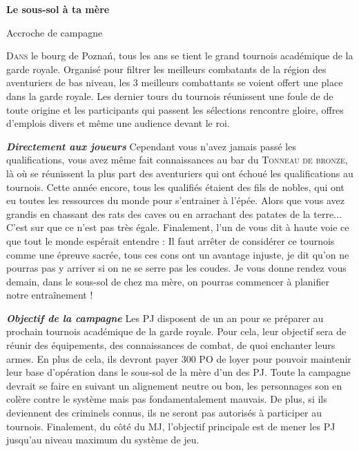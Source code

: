 \documentclass[11pt]{article} %
\newcommand{\enluminure}[2]{\lettrine[lines=3]{\small \initfamily #1}{#2}}
\begin{document}
\pagestyle{empty}

\begin{center}
    \textbf{Le sous-sol à ta mère}

    Accroche de campagne
\end{center}

\enluminure{D}{ans} le bourg de Poznań, tous les ans se tient le grand tournois académique de la garde royale. Organisé pour filtrer les meilleurs combatants de la région des aventuriers de bas niveau, les 3 meilleurs combattants se voient offert une place dans la garde royale. Les dernier tours du tournois réunissent une foule de de toute origine et les participants qui passent les sélections rencontre gloire, offres d'emplois divers et même une audience devant le roi.\newline\newline


\noindent \textbf{\emph{Directement aux joueurs}}\newline
Cependant vous n'avez jamais passé les qualifications, vous avez même fait connaissances au bar du \textsc{Tonneau de bronze}, là où se réunissent la plus part des aventuriers qui ont échoué les qualifications au tournois. Cette année encore, tous les qualifiés étaient des fils de nobles, qui ont eu toutes les ressources du monde pour s'entrainer à l'épée. Alors que vous avez grandis en chassant des rats des caves ou en arrachant des patates de la terre... C'est sur que ce n'est pas très égale. Finalement, l'un de vous dit à haute voie ce que tout le monde espérait entendre :\newline
\og Il faut arrêter de considérer ce tournois comme une épreuve sacrée, tous ces cons ont un avantage injuste, je dit qu'on ne pourras pas y arriver si on ne se serre pas les coudes. Je vous donne rendez vous demain, dans le sous-sol de chez ma mère, on pourras commencer à planifier notre entraînement ! \fg\newline\newline


\noindent \textbf{\emph{Objectif de la campagne}}\newline
Les PJ disposent de un an pour se préparer au prochain tournois académique de la garde royale. Pour cela, leur objectif sera de réunir des équipements, des connaissances de combat, de quoi enchanter leurs armes. En plus de cela, ils devront payer 300 PO de loyer pour pouvoir maintenir leur base d'opération dans le sous-sol de la mère d'un des PJ. Toute la campagne devrait se faire en suivant un alignement neutre ou bon, les personnages son en colère contre le système mais pas fondamentalement mauvais. De plus, si ils deviennent des criminels connus, ils ne seront pas autorisés à participer au tournois. Finalement, du côté du MJ, l'objectif principale est de mener les PJ jusqu'au niveau maximum du système de jeu.\newline\newline
\end{document}
